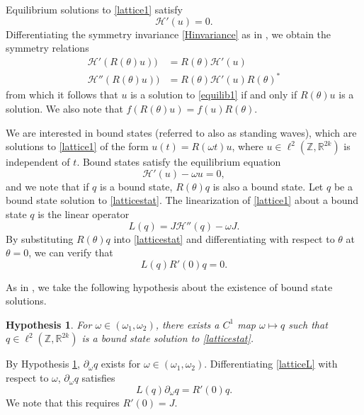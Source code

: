 \documentclass[12pt]{article}
\def\R{{\mathbb R}}
\def\Z{{\mathbb Z}}
\newtheorem{hypothesis}{Hypothesis}
\begin{document}
Equilibrium solutions to \eqref{lattice1} satisfy 
\begin{equation}\label{equilib1}
\mathcal{H}'(u) = 0.
\end{equation}
Differentiating the symmetry invariance \eqref{Hinvariance} as in \cite{Grillakis1987}, we obtain the symmetry relations
\begin{equation}\label{symmetryrel}
\begin{aligned}
\mathcal{H}'(R(\theta)u)) &= R(\theta) \mathcal{H}'(u) \\
\mathcal{H}''(R(\theta)u)) &= R(\theta) \mathcal{H}'(u) R(\theta)^*
\end{aligned}
\end{equation}
from which it follows that $u$ is a solution to \eqref{equilib1} if and only if $R(\theta)u$ is a solution. We also note that $f(R(\theta)u) = f(u)R(\theta)$.

We are interested in bound states (referred to also
as standing waves), which are solutions to \eqref{lattice1} of the form $u(t) = R(\omega t)u$, where $u \in \ell^2(\Z, \R^{2k})$ is independent of $t$. Bound states satisfy the equilibrium equation
\begin{equation}\label{latticestat}
\mathcal{H}'(u) - \omega u = 0,
\end{equation}
and we note that if $q$ is a bound state, $R(\theta)q$ is also a bound state. Let $q$ be a bound state solution to \eqref{latticestat}. The linearization of \eqref{lattice1} about a bound state $q$ is the linear operator
\begin{equation}\label{latticeL}
L(q) = J \mathcal{H}''(q) - \omega J.
\end{equation}
By substituting $R(\theta)q$ into \eqref{latticestat} and differentiating with respect to $\theta$ at $\theta = 0$, we can verify that 
\begin{equation}\label{Lkernel1}
L(q) R'(0) q = 0.
\end{equation}

\noindent As in \cite{Grillakis1987}, we take the following hypothesis about the existence of bound state solutions.
\begin{hypothesis}\label{boundstatehyp}
For $\omega \in (\omega_1, \omega_2)$, there exists a $C^1$ map $\omega \mapsto q$ such that $q \in \ell^2(\Z, \R^{2k})$ is a bound state solution to \eqref{latticestat}.
\end{hypothesis}

By Hypothesis \ref{boundstatehyp}, $\partial_\omega q$ exists for $\omega \in (\omega_1, \omega_2)$. Differentiating \eqref{latticeL} with respect to $\omega$, $\partial_\omega q$ satisfies 
\begin{equation}\label{Lkernel2}
L(q)\partial_\omega q = R'(0) q.
\end{equation}
We note that this requires $R'(0) = J$.
\end{document}
